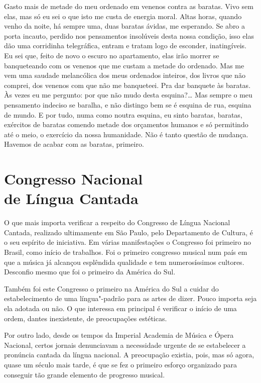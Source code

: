 Gasto mais de metade do meu ordenado em venenos contra as baratas. Vivo
sem elas, mas só eu sei o que isto me custa de energia moral. Altas
horas, quando venho da noite, há sempre uma, duas baratas ávidas, me
esperando. Se abro a porta incauto, perdido nos pensamentos insolúveis
desta nossa condição, isso elas dão uma corridinha telegráfica, entram e
tratam logo de esconder, inatingíveis. Eu sei que, feito de novo o
escuro no apartamento, elas irão morrer se banqueteando com os venenos
que me custam a metade do ordenado. Mas me vem uma saudade melancólica
dos meus ordenados inteiros, dos livros que não comprei, dos venenos com
que não me banqueteei. Pra dar banquete às baratas. Às vezes eu me
pergunto: por que não mudo desta esquina?\ldots{} Mas sempre o meu pensamento
indeciso se baralha, e não distingo bem se é esquina de rua, esquina de
mundo. E por tudo, numa como noutra esquina, eu sinto baratas, baratas,
exércitos de baratas comendo metade dos orçamentos humanos e só
permitindo até o meio, o exercício da nossa humanidade. Não é tanto
questão de mudança. Havemos de acabar com as baratas, primeiro.

\chapter[Congresso Nacional de Língua Cantada]{Congresso Nacional\\ de Língua Cantada}

O que mais importa verificar a respeito do Congresso de Língua Nacional
Cantada, realizado ultimamente em São Paulo, pelo Departamento de
Cultura, é o seu espírito de iniciativa. Em várias manifestações o
Congresso foi primeiro no Brasil, como início de trabalhos. Foi o
primeiro congresso musical num país em que a música já alcançou
esplêndida qualidade e tem numerosíssimos cultores. Desconfio mesmo que
foi o primeiro da América do Sul.

Também foi este Congresso o primeiro na América do Sul a cuidar do
estabelecimento de uma língua"-padrão para as artes de dizer. Pouco
importa seja ela adotada ou não. O que interessa em principal é
verificar o início de uma ordem, dantes inexistente, de preocupações
estéticas.

Por outro lado, desde os tempos da Imperial Academia de Música e Ópera
Nacional, certos jornais denunciavam a necessidade urgente de se
estabelecer a pronúncia cantada da língua nacional. A preocupação
existia, pois, mas só agora, quase um século mais tarde, é que se fez o
primeiro esforço organizado para conseguir tão grande elemento de
progresso musical.

